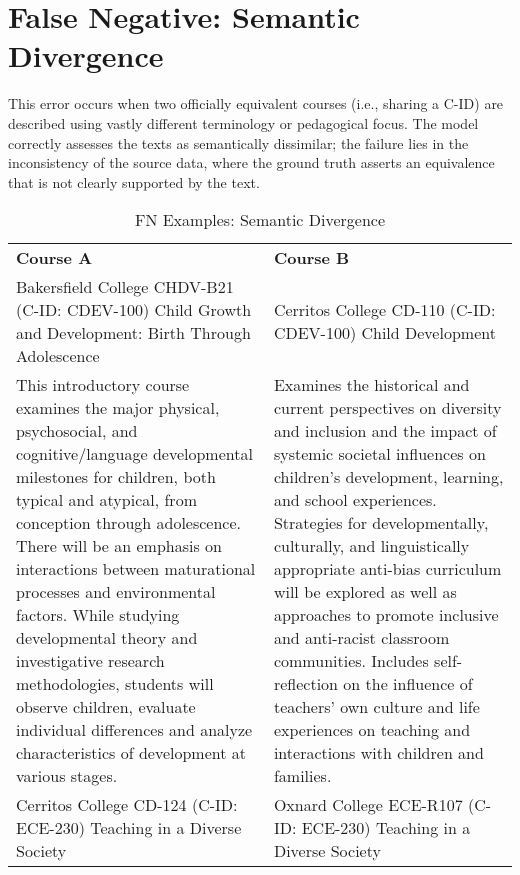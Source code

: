 \section{False Negative: Semantic Divergence}\label{app:semdiv}
This error occurs when two officially equivalent courses (i.e., sharing a C-ID) are described using vastly different terminology or pedagogical focus. The model correctly assesses the texts as semantically dissimilar; the failure lies in the inconsistency of the source data, where the ground truth asserts an equivalence that is not clearly supported by the text.

\begin{longtable}{ >{\baselineskip=12pt}p{}  >{\baselineskip=12pt}p{} }
\captionsetup{skip=5pt}
\caption{FN Examples: Semantic Divergence}\label{tab:fn_divergence}\\
\bottomrule\toprule
\textbf{\textbf{Course A}} & \textbf{Course B} \\
\bottomrule\toprule
\endhead
Bakersfield College \newline CHDV-B21 (C-ID: CDEV-100) \newline Child Growth and Development: Birth Through Adolescence & Cerritos College \newline CD-110 (C-ID: CDEV-100) \newline Child Development \\
\midrule
This introductory course examines the major physical, psychosocial, and cognitive/language developmental milestones for children, both typical and atypical, from conception through adolescence. There will be an emphasis on interactions between maturational processes and environmental factors. While studying developmental theory and investigative research methodologies, students will observe children, evaluate individual differences and analyze characteristics of development at various stages. & Examines the historical and current perspectives on diversity and inclusion and the impact of systemic societal influences on children’s development, learning, and school experiences. Strategies for developmentally, culturally, and linguistically appropriate anti-bias curriculum will be explored as well as approaches to promote inclusive and anti-racist classroom communities. Includes self-reflection on the influence of teachers’ own culture and life experiences on teaching and interactions with children and families. \\
\bottomrule\toprule
Cerritos College \newline CD-124 (C-ID: ECE-230) \newline Teaching in a Diverse Society & Oxnard College \newline ECE-R107 (C-ID: ECE-230) \newline Teaching in a Diverse Society \\

\end{longtable}
